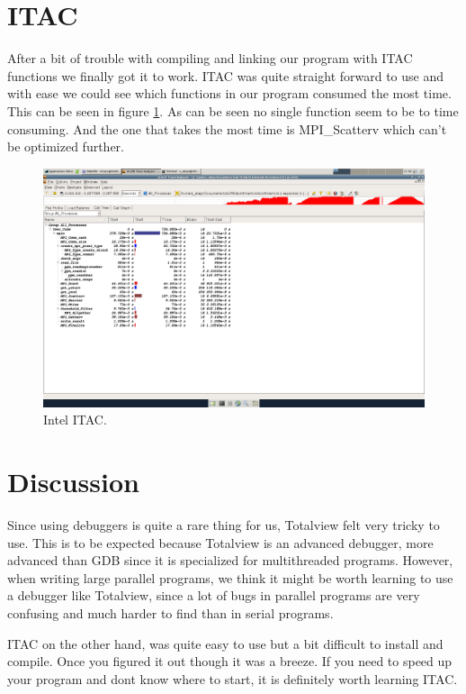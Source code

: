 \documentclass[titlepage, a4paper]{article}
\begin{document}
\section{ITAC}
After a bit of trouble with compiling and linking our program with ITAC functions we finally got it to work. ITAC was quite straight forward to use and with ease we could see which functions in our program consumed the most time. This can be seen in figure \ref{fig:itac}. As can be seen no single function seem to be to time consuming. And the one that takes the most time is MPI\_Scatterv which can't be optimized further.

\begin{figure}[H]
  \centering
  \includegraphics[scale=0.30, angle=90]{img/itac2.png}
  \caption{Intel ITAC.}
  \label{fig:itac}
\end{figure}

\section{Discussion}
Since using debuggers is quite a rare thing for us, Totalview felt very tricky to use. This is to be expected because Totalview is an advanced debugger, more advanced than GDB since it is specialized for multithreaded programs. However, when writing large parallel programs, we think it might be worth learning to use a debugger like Totalview, since a lot of bugs in parallel programs are very confusing and much harder to find than in serial programs.

ITAC on the other hand, was quite easy to use but a bit difficult to install and compile. Once you figured it out though it was a breeze. If you need to speed up your program and dont know where to start, it is definitely worth learning ITAC.
\end{document}

